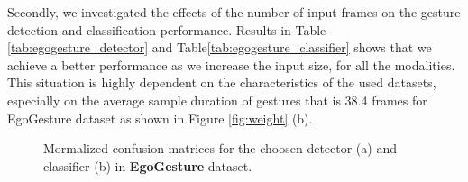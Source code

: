 Secondly, we investigated the effects of the number of input frames on the gesture detection and classification performance. Results in Table \ref{tab:egogesture_detector} and Table\ref{tab:egogesture_classifier} shows that we achieve a better performance as we increase the input size, for all the modalities. This situation is highly dependent on the characteristics of the used datasets, especially on the average sample duration of gestures that is 38.4 frames for EgoGesture dataset as shown in Figure \ref{fig:weight} (b).\\ 
\begin{figure}[b!]%
\centering
{}%
\label{fig:staego}%
\qquad
{}%
\caption{Mormalized confusion matrices for the choosen detector (a) and classifier (b) in \textbf{EgoGesture} dataset.}
\label{fig:egocm}
\end{figure}
